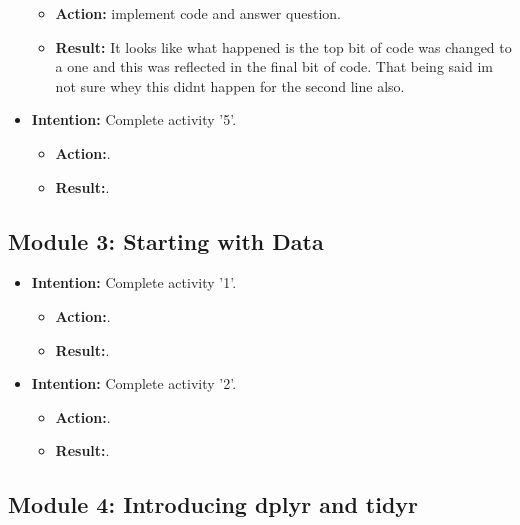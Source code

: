 \documentclass{article}
\begin{document}
\begin{itemize}
\begin{itemize}
\item{\textbf{Action:} implement code and answer question.}
\item{\textbf{Result:} It looks like what happened is the top bit of code was changed to a one and this was reflected in the final bit of code. That being said im not sure whey this didnt happen for the second line also.}
\end{itemize}

\item{\textbf{Intention:} Complete activity '5'.}

\begin{itemize}
\item{\textbf{Action:}.}
\item{\textbf{Result:}.}
\end{itemize}



\end{itemize}



\subsection{Module 3: Starting with Data}

\begin{itemize}
 
\item{\textbf{Intention:} Complete activity '1'.}

\begin{itemize}
\item{\textbf{Action:}.}
\item{\textbf{Result:}.}
\end{itemize}


\item{\textbf{Intention:} Complete activity '2'.}

\begin{itemize}
\item{\textbf{Action:}.}
\item{\textbf{Result:}.}
\end{itemize}


\end{itemize}




\subsection{Module 4: Introducing dplyr and tidyr}
\end{document}
